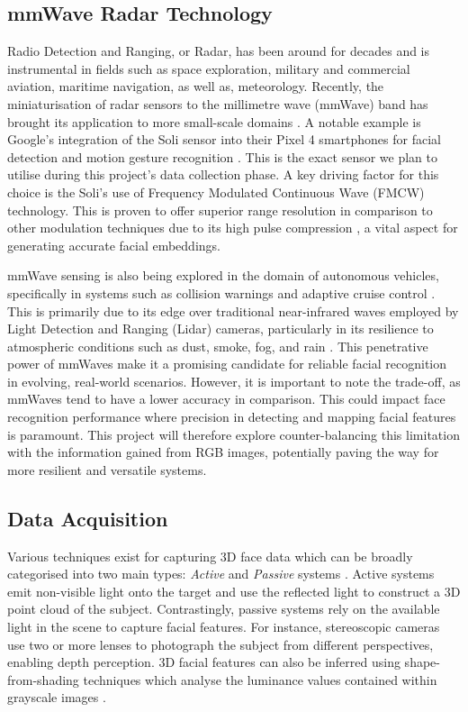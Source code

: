 \documentclass{interim}
\begin{document}
\subsection{mmWave Radar Technology}
Radio Detection and Ranging, or Radar, has been around for decades and is instrumental in fields such as space exploration, military and commercial aviation, maritime navigation, as well as, meteorology. Recently, the miniaturisation of radar sensors to the millimetre wave (mmWave) band has brought its application to more small-scale domains \cite{soumya2023recent}. A notable example is Google's integration of the Soli sensor into their Pixel 4 smartphones for facial detection and motion gesture recognition \cite{googleblog2020}. This is the exact sensor we plan to utilise during this project's data collection phase. A key driving factor for this choice is the Soli's use of Frequency Modulated Continuous Wave (FMCW) technology. This is proven to offer superior range resolution in comparison to other modulation techniques due to its high pulse compression \cite{mahafza2005radar}, a vital aspect for generating accurate facial embeddings. 

mmWave sensing is also being explored in the domain of autonomous vehicles, specifically in systems such as collision warnings and adaptive cruise control \cite{dfrobot}. This is primarily due to its edge over traditional near-infrared waves employed by Light Detection and Ranging (Lidar) cameras, particularly in its resilience to atmospheric conditions such as dust, smoke, fog, and rain \cite{cadenceblog2022}. This penetrative power of mmWaves make it a promising candidate for reliable facial recognition in evolving, real-world scenarios. However, it is important to note the trade-off, as mmWaves tend to have a lower accuracy in comparison. This could impact face recognition performance where precision in detecting and mapping facial features is paramount. This project will therefore explore counter-balancing this limitation with the information gained from RGB images, potentially paving the way for more resilient and versatile systems.


\subsection{Data Acquisition}
\label{background:data_acquisition}
Various techniques exist for capturing 3D face data which can be broadly categorised into two main types: \textit{Active} and \textit{Passive} systems \cite{zhou20183d}. Active systems emit non-visible light onto the target and use the reflected light to construct a 3D point cloud of the subject. Contrastingly, passive systems rely on the available light in the scene to capture facial features. For instance, stereoscopic cameras use two or more lenses to photograph the subject from different perspectives, enabling depth perception. 3D facial features can also be inferred using shape-from-shading techniques which analyse the luminance values contained within grayscale images \cite{horn1977understanding}.
\end{document}
